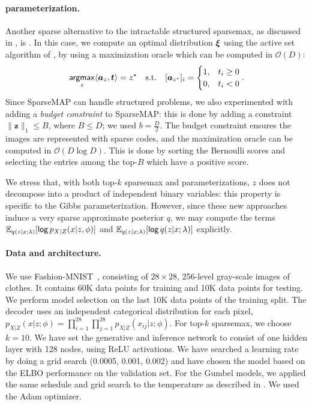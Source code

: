 \paragraph*{\smap parameterization.} Another sparse alternative to the
intractable structured sparsemax, as discussed in
, is \smap. In this case, we compute an optimal
distribution $\bm{\xi}$ using the active set algorithm of
\citet{sparsemap}, by using a maximization oracle which
can be computed in $\mathcal{O}(D)$:
\begin{equation}
    \operatorname*{\mathsf{argmax}}_z \langle\bm{a}_z,\bm{t}\rangle = z^\star \quad \text{s.t.}\quad
    [\bm{a}_{z^\star}]_i = \begin{cases}
        1, & t_i \geq 0 \\
        0, & t_i < 0    \\
    \end{cases}.
\end{equation}
Since SparseMAP can handle structured problems, we also experimented
with adding a \emph{budget constraint} to SparseMAP: this is done by
adding a constraint $\|\bm{z}\|_1 \le B$, where $B \le D$; we used
$b=\frac{D}{2}$. The budget constraint ensures the images are
represented with sparse codes, and the maximization oracle can be
computed in $\mathcal{O}(D \log D)$. This
is done by sorting the Bernoulli scores and selecting the entries
among the top-$B$ which have a positive score.

We stress that, with both top-$k$ sparsemax and \smap parameterizations,
$z$ does not decompose into a product of independent
binary variables: this property is specific to the Gibbs parameterization.
However, since these new approaches induce a very sparse approximate posterior
$q$, we may compute the terms $\mathbb{E}_{q(z|x; \lambda)} [\operatorname*{\mathsf{log}} p_{X|Z}(x |z,
        \phi)]$ and $\mathbb{E}_{q(z|x; \lambda)} [\operatorname*{\mathsf{log}} q(z |x; \lambda)]$
explicitly.

\paragraph*{Data and architecture.} We use
Fashion-MNIST~\citep{fmnist}, consisting of $28 \times 28$, 256-level
gray-scale images of clothes. It contains 60K data points for training
and 10K data points for testing. We perform model selection on the
last 10K data points of the training split. The decoder uses an
independent categorical distribution for each pixel, $p_{X|Z}(x |z; \phi) =
    \prod_{i=1}^{28} \prod_{j=1}^{28} p_{X|Z}(x_{ij} |z; \phi)$. For top-$k$
sparsemax, we choose $k=10$. We have set the generative and inference
network to consist of one hidden layer with 128 nodes, using ReLU
activations. We have searched a learning rate by doing a grid search
(0.0005, 0.001, 0.002) and have chosen the model based on the ELBO
performance on the validation set. For the Gumbel models, we applied
the same schedule and grid search to the temperature as described in
. We used the Adam optimizer.

